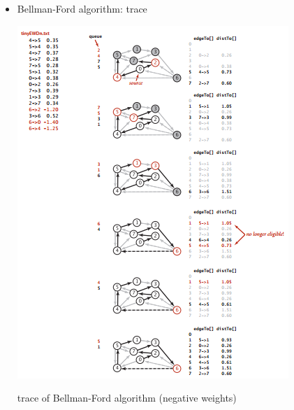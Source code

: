\documentclass[8pt,a4paper,compress]{beamer}
\begin{document}
\begin{frame}[fragile]
\begin{itemize}
\item Bellman-Ford algorithm: trace
\begin{center}

\includegraphics[scale=0.42]{./figures/sp6.png}

\smallskip

\small trace of Bellman-Ford algorithm (negative weights)
\end{center}
\end{itemize}
\end{frame}
\end{document}
